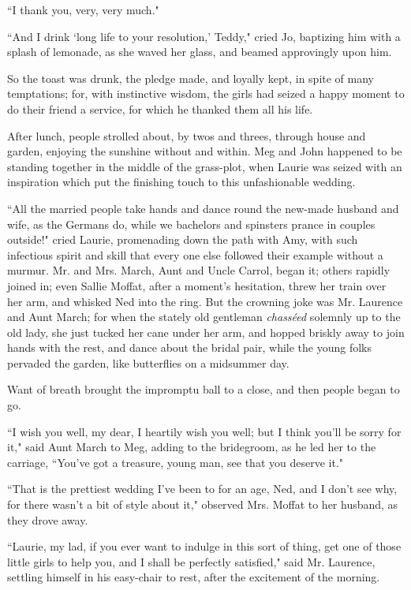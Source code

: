 ``I thank you, very, very much."

``And I drink `long life to your
resolution,' Teddy," cried Jo, baptizing him with a
splash of lemonade, as she waved her glass, and beamed approvingly upon
him.

So the toast was drunk, the pledge made, and loyally kept, in spite of
many temptations; for, with instinctive wisdom, the girls had seized a
happy moment to do their friend a service, for which he thanked them all
his life.

After lunch, people strolled about, by twos and threes, through house
and garden, enjoying the sunshine without and within. Meg and John
happened to be standing together in the middle of the grass-plot, when
Laurie was seized with an inspiration which put the finishing touch to
this unfashionable wedding.

``All the married people take hands and dance round the new-made husband
and wife, as the Germans do, while we bachelors and spinsters prance in
couples outside!" cried Laurie, promenading down the path with Amy, with
such infectious spirit and skill that every one else followed their
example without a murmur. Mr. and Mrs. March, Aunt and Uncle Carrol,
began it; others rapidly joined in; even Sallie Moffat, after a
moment's hesitation, threw her train over her arm, and
whisked Ned into the ring. But the crowning joke was Mr. Laurence and
Aunt March; for when the stately old gentleman \emph{chasséed} solemnly
up to the old lady, she just tucked her cane under her arm, and hopped
briskly away to join hands with the rest, and dance about the bridal
pair, while the young folks pervaded the garden, like butterflies on a
midsummer day.

Want of breath brought the impromptu ball to a close, and then people
began to go.

``I wish you well, my dear, I heartily wish you well; but I think
you'll be sorry for it," said Aunt March to Meg, adding
to the bridegroom, as he led her to the carriage,
``You've got a treasure, young man, see that you deserve
it."

``That is the prettiest wedding I've been to for an age,
Ned, and I don't see why, for there
wasn't a bit of style about it," observed Mrs. Moffat to
her husband, as they drove away.

``Laurie, my lad, if you ever want to indulge in this sort of thing, get
one of those little girls to help you, and I shall be perfectly
satisfied," said Mr. Laurence, settling himself in his easy-chair to
rest, after the excitement of the morning.

